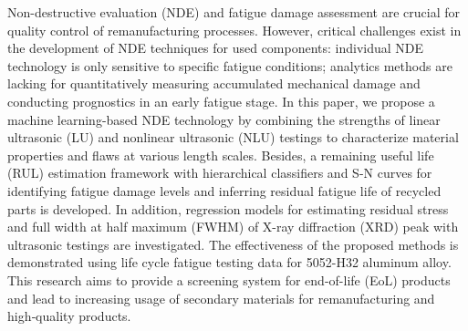 Non-destructive evaluation (NDE) and fatigue damage assessment are crucial for quality control of remanufacturing processes. However, critical challenges exist in the development of NDE techniques for used components: individual NDE technology is only sensitive to specific fatigue conditions; analytics methods are lacking for quantitatively measuring accumulated mechanical damage and conducting prognostics in an early fatigue stage. In this paper, we propose a machine learning-based NDE technology by combining the strengths of linear ultrasonic (LU) and nonlinear ultrasonic (NLU) testings to characterize material properties and flaws at various length scales. Besides, a remaining useful life (RUL) estimation framework with hierarchical classifiers and S-N curves for identifying fatigue damage levels and inferring residual fatigue life of recycled parts is developed. In addition, regression models for estimating residual stress and full width at half maximum (FWHM) of X-ray diffraction (XRD) peak with ultrasonic testings are investigated. The effectiveness of the proposed methods is demonstrated using life cycle fatigue testing data for 5052-H32 aluminum alloy. This research aims to provide a screening system for end-of-life (EoL) products and lead to increasing usage of secondary materials for remanufacturing and high‐quality products.
